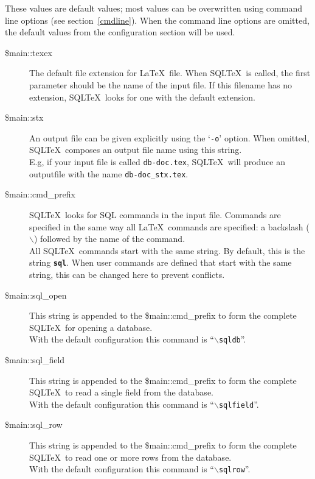 \documentclass{article}
\newcommand{\bs}{\ensuremath{\backslash}}
\newcommand{\vs}{\vspace{3mm}}
\begin{document}
\vs

These values are default values; most values can be overwritten using command line
options (see section~\ref{cmdline}). When the command line options are
omitted, the default values from the configuration section will be used.

\begin{description}

\item[\$main::texex] The default file extension for \LaTeX\ file. When SQL\TeX\ is called, the first
parameter should be the name of the input file. If this filename has no extension,
SQL\TeX\ looks for one with the default extension.

\item[\$main::stx] An output file can be given explicitly using the `\texttt{-o}' option. When omitted,
SQL\TeX\ composes an output file name using this string.\\
E.g, if your input file is called \texttt{db-doc.tex}, SQL\TeX\ will produce an
outputfile with the name \texttt{db-doc\_stx.tex}.

\item[\$main::cmd\_prefix]\label{prefix} SQL\TeX\ looks for SQL commands in the input file. Commands are specified in the
same way all \LaTeX\ commands are specified: a backslash (\bs) followed by the
name of the command.\\
All SQL\TeX\ commands start with the same string. By default, this is the string
\texttt{\textbf{sql}}. When user commands are defined that start with the same
string, this can be changed here to prevent conflicts.

\item[\$main::sql\_open] This string is appended to the \$main::cmd\_prefix to form the complete SQL\TeX\
for opening a database.\\
With the default configuration this command is ``\texttt{\bs sqldb}''.

\item[\$main::sql\_field] This string is appended to the \$main::cmd\_prefix to form the complete SQL\TeX\
to read a single field from the database.\\
With the default configuration this command is ``\texttt{\bs sqlfield}''.

\item[\$main::sql\_row] This string is appended to the \$main::cmd\_prefix to form the complete SQL\TeX\
to read one or more rows from the database.\\
With the default configuration this command is ``\texttt{\bs sqlrow}''.


\end{description}
\end{document}
